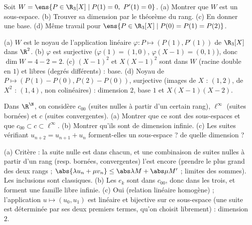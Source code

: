 \begin{exo}
Soit $W=\ens{P\in\R_3[X]\mid P(1)=0,\ P'(1)=0}$. (a) Montrer que $W$ est un sous-espace. (b) Trouver sa dimension par le théorème du rang. (c) En donner une base. (d) Même travail pour $\ens{P\in\R_3[X]\mid P(0)=P(1)=P(2)}$.
\begin{corrige}
(a) $W$ est le noyau de l'application linéaire $\varphi:P\mapsto(P(1),P'(1))$ de $\R_3[X]$ dans $\R^2$. (b) $\varphi$ est surjective ($\varphi(1)=(1,0)$, $\varphi(X-1)=(0,1)$), donc $\dim W=4-2=2$. (c) $(X-1)^2$ et $X(X-1)^2$ sont dans $W$ (racine double en $1$) et libres (degrés différents) : base. (d) Noyau de $P\mapsto(P(1)-P(0),P(2)-P(0))$, surjective (images de $X$ : $(1,2)$, de $X^2$ : $(1,4)$, non colinéaires) : dimension $2$, base $1$ et $X(X-1)(X-2)$.
\end{corrige}
\end{exo}
\begin{exo}
Dans $\R^{\N}$, on considère $c_{00}$ (suites nulles à partir d'un certain rang), $\ell^\infty$ (suites bornées) et $c$ (suites convergentes). (a) Montrer que ce sont des sous-espaces et que $c_{00}\subset c\subset\ell^\infty$. (b) Montrer qu'ils sont de dimension infinie. (c) Les suites vérifiant $u_{n+2}=u_{n+1}+u_n$ forment-elles un sous-espace ? de quelle dimension ?
\begin{corrige}
(a) Critère : la suite nulle est dans chacun, et une combinaison de suites nulles à partir d'un rang (resp. bornées, convergentes) l'est encore (prendre le plus grand des deux rangs ; $\abs{\lambda u_n+\mu v_n}\le\abs\lambda M+\abs\mu M'$ ; limites des sommes). Les inclusions sont classiques. (b) Les $e_k$ sont dans $c_{00}$, donc dans les trois, et forment une famille libre infinie. (c) Oui (relation linéaire homogène) ; l'application $u\mapsto(u_0,u_1)$ est linéaire et bijective sur ce sous-espace (une suite est déterminée par ses deux premiers termes, qu'on choisit librement) : dimension $2$.
\end{corrige}
\end{exo}
